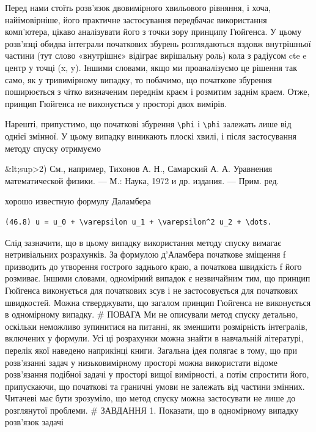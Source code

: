\documentclass[
  ukrainian,
]{article}
\begin{document}
Перед нами стоїть розв'язок двовимірного хвильового рівняння, і хоча,
найімовірніше, його практичне застосування передбачає використання
комп'ютера, цікаво аналізувати його з точки зору принципу Гюйгенса. У
цьому розв'язці обидва інтеграли початкових збурень розглядаються вздовж
внутрішньої частини (тут слово «внутрішнє» відіграє вирішальну роль)
кола з радіусом cte e центр у точці (x, y). Іншими словами, якщо ми
проаналізуємо це рішення так само, як у тривимірному випадку, то
побачимо, що початкове збурення поширюється з чітко визначеним переднім
краєм і розмитим заднім краєм. Отже, принцип Гюйгенса не виконується у
просторі двох вимірів.

Нарешті, припустимо, що початкові збурення \texttt{\textbackslash{}phi}
і \texttt{\textbackslash{}phi} залежать лише від однієї змінної. У цьому
випадку виникають плоскі хвилі, і після застосування методу спуску
отримуємо

\&lt;sup\textgreater2) См., например, Тихонов А. Н., Самарский А. А.
Уравнения математической физики. --- М.: Наука, 1972 и др. издания. ---
Прим. ред.

хорошо известную формулу Даламбера

\begin{verbatim}
(46.8) u = u_0 + \varepsilon u_1 + \varepsilon^2 u_2 + \dots.
\end{verbatim}

Слід зазначити, що в цьому випадку використання методу спуску вимагає
нетривіальних розрахунків. За формулою д'Аламбера початкове зміщення f
призводить до утворення гострого заднього краю, а початкова швидкість f
його розмиває. Іншими словами, одномірний випадок є незвичайним тим, що
принцип Гюйгенса виконується для початкових зсув і не застосовується для
початкових швидкостей. Можна стверджувати, що загалом принцип Гюйгенса
не виконується в одномірному випадку. \# ПОВАГА Ми не описували метод
спуску детально, оскільки неможливо зупинитися на питанні, як зменшити
розмірність інтегралів, включених у формули. Усі ці розрахунки можна
знайти в навчальній літературі, перелік якої наведено наприкінці книги.
Загальна ідея полягає в тому, що при розв'язанні задач у низьковимірному
просторі можна використати відоме розв'язання подібної задачі у просторі
вищої вимірності, а потім спростити його, припускаючи, що початкові та
граничні умови не залежать від частини змінних. Читачеві має бути
зрозуміло, що метод спуску можна застосувати не лише до розглянутої
проблеми. \# ЗАВДАННЯ 1. Показати, що в одномірному випадку розв'язок
задачі
\end{document}
